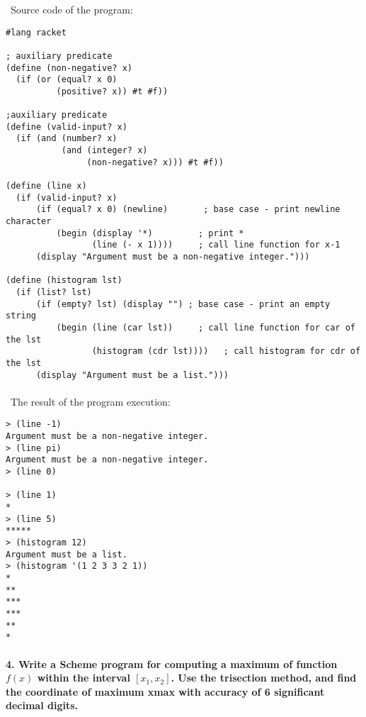 \documentclass{article}
\begin{document}
\paragraph{}\
\paragraph{}\
\paragraph{}\
Source code of the program:

\begin{verbatim} 
#lang racket

; auxiliary predicate
(define (non-negative? x)
  (if (or (equal? x 0)
          (positive? x)) #t #f))

;auxiliary predicate
(define (valid-input? x)
  (if (and (number? x)
           (and (integer? x)
                (non-negative? x))) #t #f))

(define (line x)
  (if (valid-input? x)
      (if (equal? x 0) (newline)	   ; base case - print newline character
          (begin (display '*)	      ; print *
                 (line (- x 1))))	  ; call line function for x-1
      (display "Argument must be a non-negative integer.")))

(define (histogram lst)
  (if (list? lst)
      (if (empty? lst) (display "")	; base case - print an empty string
          (begin (line (car lst))	  ; call line function for car of the lst
                 (histogram (cdr lst))))   ; call histogram for cdr of the lst
      (display "Argument must be a list.")))
\end{verbatim}

\paragraph{}\
	The result of the program execution:
	
\begin{verbatim} 
> (line -1)
Argument must be a non-negative integer.
> (line pi)
Argument must be a non-negative integer.
> (line 0)

> (line 1)
*
> (line 5)
*****
> (histogram 12)
Argument must be a list.
> (histogram '(1 2 3 3 2 1))
*
**
***
***
**
*
\end{verbatim}

\paragraph{4. Write a Scheme program for computing a maximum of function \(f(x)\) within the interval \([x_1, x_2]\). Use the trisection method, and find the coordinate of maximum xmax with accuracy of 6 significant decimal digits.}\
\end{document}
